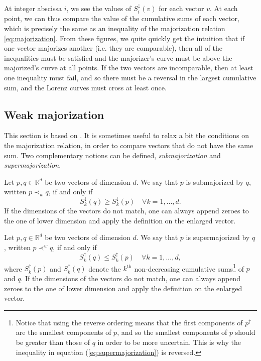At integer abscissa $i$, we see the values of $S_i^\downarrow (v)$ for each vector $v$. At each point, we can thus compare the value of the cumulative sums of each vector, which is precisely the same as an inequality of the majorization relation \ref{eq:majorization}. From these figures, we quite quickly get the intuition that if one vector majorizes another (i.e. they are comparable), then all of the inequalities must be satisfied and the majorizer's curve must be above the majorized's curve at all points. If the two vectors are incomparable, then at least one inequality must fail, and so there must be a reversal in the largest cumulative sum, and the Lorenz curves must cross at least once.

\subsection{Weak majorization}

This section is based on \cite[pp. 10--15]{marshall_inequalities_2011}. It is sometimes useful to relax a bit the conditions on the majorization relation, in order to compare vectors that do not have the same sum. Two complementary notions can be defined, \textit{submajorization} and \textit{supermajorization}.

\begin{definition}[Submajorization] \label{def:submajorization}
    Let $p, q \in \mathbb{R}^d$ be two vectors of dimension $d$. We say that $p$ is submajorized by $q$, written $p \prec_w q$, if and only if
    \begin{equation} \label{eq:submajorization}
            S^\downarrow_k (q) \geq S^\downarrow_k (p) \quad \forall k = 1,...,d.
    \end{equation}
If the dimensions of the vectors do not match, one can always append zeroes to the one of lower dimension and apply the definition on the enlarged vector.
\end{definition}

\begin{definition}[Supermajorization] \label{def:supermajorization}
    Let $p, q \in \mathbb{R}^d$ be two vectors of dimension $d$. We say that $p$ is supermajorized by $q$, written $p \prec^w q$, if and only if
    \begin{equation} \label{eq:supermajorization}
            S^\uparrow_k (q) \leq S^\uparrow_k (p) \quad \forall k = 1,...,d,
    \end{equation}
where $S^\uparrow_k(p)$ and $S^\uparrow_k (q)$ denote the $k^\text{th}$ non-decreasing cumulative sums\footnote{Notice that using the reverse ordering means that the first components of $p^\uparrow$ are the smallest components of $p$, and so the smallest components of $p$ should be greater than those of $q$ in order to be more uncertain. This is why the inequality in equation (\ref{eq:supermajorization}) is reversed.} of $p$ and $q$. If the dimensions of the vectors do not match, one can always append zeroes to the one of lower dimension and apply the definition on the enlarged vector.
\end{definition}

